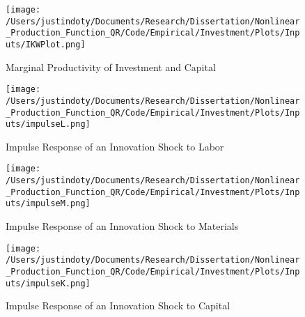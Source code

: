 \documentclass{article}
\begin{document}
\begin{figure}[H]
\centering
\caption{Marginal Productivity of Investment and Capital}
\texttt{[image: /Users/justindoty/Documents/Research/Dissertation/Nonlinear\_Production\_Function\_QR/Code/Empirical/Investment/Plots/Inputs/IKWPlot.png]}
\label{ikw}
\end{figure}

\begin{figure}[H]
\centering
\caption{Impulse Response of an Innovation Shock to Labor}
\texttt{[image: /Users/justindoty/Documents/Research/Dissertation/Nonlinear\_Production\_Function\_QR/Code/Empirical/Investment/Plots/Inputs/impulseL.png]}
\label{impulseL}
\end{figure}

\begin{figure}[H]
\centering
\caption{Impulse Response of an Innovation Shock to Materials}
\texttt{[image: /Users/justindoty/Documents/Research/Dissertation/Nonlinear\_Production\_Function\_QR/Code/Empirical/Investment/Plots/Inputs/impulseM.png]}
\label{impulseM}
\end{figure}

\begin{figure}[H]
\centering
\caption{Impulse Response of an Innovation Shock to Capital}
\texttt{[image: /Users/justindoty/Documents/Research/Dissertation/Nonlinear\_Production\_Function\_QR/Code/Empirical/Investment/Plots/Inputs/impulseK.png]}
\label{impulseK}
\end{figure}


\pagebreak
\newpage



\pagebreak
\newpage

\appendix

                                          
\end{document}
